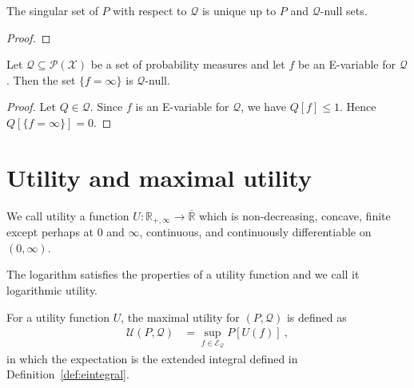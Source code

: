 \begin{lemma}\label{lem:singularSet_unique}
The singular set of $P$ with respect to $\mathcal{Q}$ is unique up to $P$ and $\mathcal{Q}$-null sets.
\end{lemma}

\begin{proof}

\end{proof}


\begin{lemma}\label{lem:nullSet_eq_top}
Let $\mathcal{Q} \subseteq \mathcal{P}(\mathcal{X})$ be a set of probability measures and let $f$ be an E-variable for $\mathcal{Q}$.
Then the set $\{f = \infty\}$ is $\mathcal{Q}$-null.
\end{lemma}

\begin{proof}
Let $Q \in \mathcal{Q}$.
Since $f$ is an E-variable for $\mathcal{Q}$, we have $Q[f] \le 1$.
Hence $Q[\{f = \infty\}] = 0$.
\end{proof}




\section{Utility and maximal utility}


\begin{definition}\label{def:Utility}
  \leanok
We call utility a function $U : \mathbb{R}_{+,\infty} \to \overline{\mathbb{R}}$ which is non-decreasing, concave, finite except perhaps at 0 and $\infty$, continuous, and continuously differentiable on $(0, \infty)$.
\end{definition}


\begin{definition}\label{def:logUtility}
  \leanok
The logarithm satisfies the properties of a utility function and we call it logarithmic utility.
\end{definition}


\begin{definition}\label{def:maxUtility}
  \leanok
For a utility function $U$, the maximal utility for $(P, \mathcal{Q})$ is defined as
\begin{align*}
  \mathcal{U}(P, \mathcal{Q})
  &= \sup_{f \in \mathcal{E}_{\mathcal{Q}}} P[U(f)]
  \: ,
\end{align*}
in which the expectation is the extended integral defined in Definition~\ref{def:eintegral}.
\end{definition}


